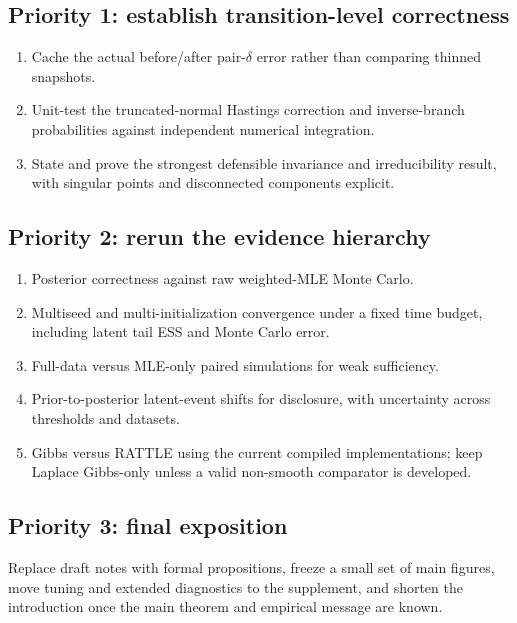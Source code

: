 \documentclass[smallextended,natbib,runningheads]{svjour3}
\begin{document}
\subsection*{Priority 1: establish transition-level correctness}
\begin{enumerate}
  \item Cache the actual before/after pair-$\delta$ error rather than comparing
  thinned snapshots.
  \item Unit-test the truncated-normal Hastings correction and inverse-branch
  probabilities against independent numerical integration.
  \item State and prove the strongest defensible invariance and irreducibility
  result, with singular points and disconnected components explicit.
\end{enumerate}

\subsection*{Priority 2: rerun the evidence hierarchy}
\begin{enumerate}
  \item Posterior correctness against raw weighted-MLE Monte Carlo.
  \item Multiseed and multi-initialization convergence under a fixed time
  budget, including latent tail ESS and Monte Carlo error.
  \item Full-data versus MLE-only paired simulations for weak sufficiency.
  \item Prior-to-posterior latent-event shifts for disclosure, with uncertainty
  across thresholds and datasets.
  \item Gibbs versus RATTLE using the current compiled implementations; keep
  Laplace Gibbs-only unless a valid non-smooth comparator is developed.
\end{enumerate}

\subsection*{Priority 3: final exposition}
Replace draft notes with formal propositions, freeze a small set of main
figures, move tuning and extended diagnostics to the supplement, and shorten
the introduction once the main theorem and empirical message are known.
\end{document}

